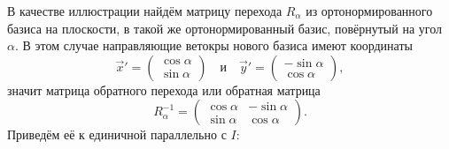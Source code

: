     В качестве иллюстрации найдём матрицу перехода $R_\alpha$ из ортонормированного базиса на плоскости, в такой же ортонормированный базис, повёрнутый на угол $\alpha$. В этом случае направляющие ветокры нового базиса имеют координаты
    \begin{equation*}
        \vec{x}' = \begin{pmatrix}
            \cos \alpha \\ 
            \sin \alpha
        \end{pmatrix} 
        \quad  \text{и} \quad
        \vec{y}' = \begin{pmatrix}
            -\sin \alpha \\
            \cos \alpha
        \end{pmatrix},
    \end{equation*}
    значит матрица обратного перехода или обратная матрица 
    \begin{equation*}
        R_\alpha^{-1} = \begin{pmatrix}
            \cos \alpha & -\sin \alpha \\ 
            \sin \alpha & \cos \alpha
        \end{pmatrix}.
    \end{equation*} 
    Приведём её к единичной параллельно с $I$:
